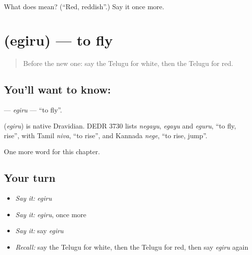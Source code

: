 \begin{tcolorbox}[breakable,colback=teal!4,colframe=teal!35!black,title={Before you move on}]
What does  mean? (\textquotedblleft{}Red, reddish\textquotedblright{}.) Say it once more.
\end{tcolorbox}
\section[\texorpdfstring{\te{ఎగురు} (egiru)}{ఎగురు (egiru)}]{ (egiru) — to fly}

\label{lesson:TE-C143-egiru}



\begin{quote}
Before the new one: say the Telugu for white, then the Telugu for red.
\end{quote}

\subsection*{You'll want to know: }
\textbf{} — \emph{egiru} — \textquotedblleft{}to fly\textquotedblright{}.

\begin{cousinweb}
\textbf{} (\emph{egiru}) is native Dravidian. DEDR 3730 lists \emph{negayu}, \emph{egayu} and \emph{eguru}, \textquotedblleft{}to fly, rise\textquotedblright{}, with Tamil \emph{niva}, \textquotedblleft{}to rise\textquotedblright{}, and Kannada \emph{nege}, \textquotedblleft{}to rise, jump\textquotedblright{}.
\end{cousinweb}

\begin{grammarlens}[title={What you've built}]
One more word for this chapter.
\end{grammarlens}

\subsection*{Your turn}
\begin{itemize}
\raggedright
  \item \emph{Say it:} \emph{egiru}
  \item \emph{Say it:} \emph{egiru}, once more
  \item \emph{Say it:} say \emph{egiru}
  \item \emph{Recall:} say the Telugu for white, then the Telugu for red, then say \emph{egiru} again
\end{itemize}

